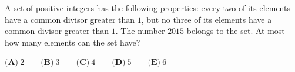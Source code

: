 A set of positive integers has the following properties: every two of its elements have a common divisor greater than $1$, but no three of its elements have a common divisor greater than $1$. The number $2015$ belongs to the set. At most how many elements can the set have?

$\textbf{(A)}\ 2\qquad\textbf{(B)}\ 3\qquad\textbf{(C)}\ 4\qquad\textbf{(D)}\ 5\qquad\textbf{(E)}\ 6$

